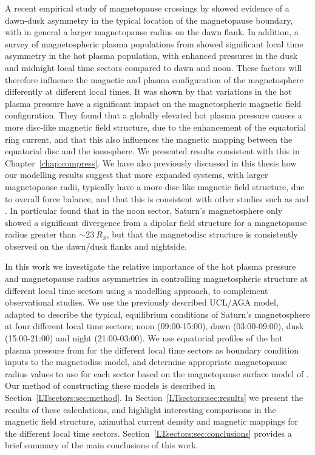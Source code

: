 A recent empirical study of magnetopause crossings by \citet{pilkington2015b} showed evidence of a dawn-dusk asymmetry in the typical location of the magnetopause boundary, with in general a larger magnetopause radius on the dawn flank. In addition, a survey of magnetospheric plasma populations from \citet{sergis2017} showed significant local time asymmetry in the hot plasma population, with enhanced pressures in the dusk and midnight local time sectors compared to dawn and noon. These factors will therefore influence the magnetic and plasma configuration of the magnetosphere differently at different local times. It was shown by \citet{achilleos2010b} that variations in the hot plasma pressure have a significant impact on the magnetospheric magnetic field configuration. They found that a globally elevated hot plasma pressure causes a more disc-like magnetic field structure, due to the enhancement of the equatorial ring current, and that this also influences the magnetic mapping between the equatorial disc and the ionosphere. We presented results consistent with this in Chapter~\ref{chap:compress}. We have also previously discussed in this thesis how our modelling results suggest that more expanded systems, with larger magnetopause radii, typically have a more disc-like magnetic field structure, due to overall force balance, and that this is consistent with other studies such as \citet{bunce2008} and \citet{arridge2008}. In particular \citet{arridge2008} found that in the noon sector, Saturn's magnetosphere only showed a significant divergence from a dipolar field structure for a magnetopause radius greater than ${\sim}\SI{23}{R_S}$, but that the magnetodisc structure is consistently observed on the dawn/dusk flanks and nightside.

In this work we investigate the relative importance of the hot plasma pressure and magnetopause radius asymmetries in controlling magnetospheric structure at different local time sectors using a modelling approach, to complement observational studies. We use the previously described UCL/AGA model, adapted to describe the typical, equilibrium conditions of Saturn's magnetosphere at four different local time sectors; noon (09:00-15:00), dawn (03:00-09:00), dusk (15:00-21:00) and night (21:00-03:00). We use equatorial profiles of the hot plasma pressure from \citet{sergis2017} for the different local time sectors as boundary condition inputs to the magnetodisc model, and determine appropriate magnetopause radius values to use for each sector based on the magnetopause surface model of \citet{pilkington2015b}. Our method of constructing these models is described in Section~\ref{LTsectors:sec:method}. In Section~\ref{LTsectors:sec:results} we present the results of these calculations, and highlight interesting comparisons in the magnetic field structure, azimuthal current density and magnetic mappings for the different local time sectors. Section~\ref{LTsectors:sec:conclusions} provides a brief summary of the main conclusions of this work.

